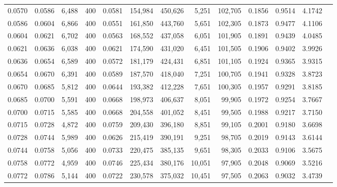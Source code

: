 \begin{tabular}{rrrrrrrrrrrrr}
0.0570 & 0.0586 &  6,488 & 400 &                                     0.0581 & 154,984 & 450,626 &   5,251 & 102,705 & 0.1856 & 0.9514 & 4.1742 \\
0.0586 & 0.0604 &  6,866 & 400 &                                     0.0551 & 161,850 & 443,760 &   5,651 & 102,305 & 0.1873 & 0.9477 & 4.1106 \\
0.0604 & 0.0621 &  6,702 & 400 &                                     0.0563 & 168,552 & 437,058 &   6,051 & 101,905 & 0.1891 & 0.9439 & 4.0485 \\
0.0621 & 0.0636 &  6,038 & 400 &                                     0.0621 & 174,590 & 431,020 &   6,451 & 101,505 & 0.1906 & 0.9402 & 3.9926 \\
0.0636 & 0.0654 &  6,589 & 400 &                                     0.0572 & 181,179 & 424,431 &   6,851 & 101,105 & 0.1924 & 0.9365 & 3.9315 \\
0.0654 & 0.0670 &  6,391 & 400 &                                     0.0589 & 187,570 & 418,040 &   7,251 & 100,705 & 0.1941 & 0.9328 & 3.8723 \\
0.0670 & 0.0685 &  5,812 & 400 &                                     0.0644 & 193,382 & 412,228 &   7,651 & 100,305 & 0.1957 & 0.9291 & 3.8185 \\
0.0685 & 0.0700 &  5,591 & 400 &                                     0.0668 & 198,973 & 406,637 &   8,051 &  99,905 & 0.1972 & 0.9254 & 3.7667 \\
0.0700 & 0.0715 &  5,585 & 400 &                                     0.0668 & 204,558 & 401,052 &   8,451 &  99,505 & 0.1988 & 0.9217 & 3.7150 \\
0.0715 & 0.0728 &  4,872 & 400 &                                     0.0759 & 209,430 & 396,180 &   8,851 &  99,105 & 0.2001 & 0.9180 & 3.6698 \\
0.0728 & 0.0744 &  5,989 & 400 &                                     0.0626 & 215,419 & 390,191 &   9,251 &  98,705 & 0.2019 & 0.9143 & 3.6144 \\
0.0744 & 0.0758 &  5,056 & 400 &                                     0.0733 & 220,475 & 385,135 &   9,651 &  98,305 & 0.2033 & 0.9106 & 3.5675 \\
0.0758 & 0.0772 &  4,959 & 400 &                                     0.0746 & 225,434 & 380,176 &  10,051 &  97,905 & 0.2048 & 0.9069 & 3.5216 \\
0.0772 & 0.0786 &  5,144 & 400 &                                     0.0722 & 230,578 & 375,032 &  10,451 &  97,505 & 0.2063 & 0.9032 & 3.4739 \\

\end{tabular}
